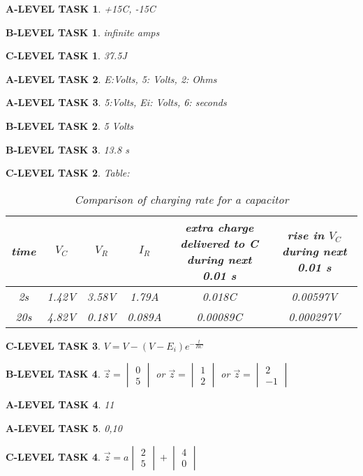 \documentclass{book}
\numberwithin{equation}{section}
\newtheorem{alevel}{A-LEVEL TASK}
\newtheorem{blevel}{B-LEVEL TASK}
\newtheorem{clevel}{C-LEVEL TASK}
\theoremstyle{definition}
\begin{document}
\begin{alevel}+15C, -15C\end{alevel}
\begin{blevel}infinite amps\end{blevel}
\begin{clevel}37.5J\end{clevel}

\begin{alevel}E:Volts, 5: Volts, 2: Ohms\end{alevel}
\begin{alevel}5:Volts, Ei: Volts, 6: seconds\end{alevel}
\begin{blevel}5 Volts\end{blevel}
\begin{blevel}13.8 s\end{blevel}

\begin{clevel} Table:\par
\begin{table}[H]
\begin{center}
\begin{tabular}{|c|c|c|c|c|c|} \hline
time&$V_C$&$V_R$&$I_R$&extra charge delivered to C during next 0.01 s&rise in $V_C$ during next 0.01 s \\ \hline
2s&1.42V&3.58V&1.79A&0.018C&0.00597V \\ \hline
20s&4.82V&0.18V&0.089A&0.00089C&0.000297V \\ \hline
\end{tabular}
\caption{Comparison of charging rate for a capacitor}
\end{center}
\end{table}
\end{clevel}

\begin{clevel}$V=V-(V-E_i)e^{-\frac{t}{RC}}$ \end{clevel}

\begin{blevel}
$\vec{z}= \begin{vmatrix}0\\5\end{vmatrix}$ or
$\vec{z}= \begin{vmatrix}1\\2\end{vmatrix}$ or 
$\vec{z}= \begin{vmatrix}2\\-1\end{vmatrix}$ 
\end{blevel}
\begin{alevel}11\end{alevel}
\begin{alevel}0,10\end{alevel}
\begin{clevel}$\vec{z}= a\begin{vmatrix}2\\5\end{vmatrix}+\begin{vmatrix}4\\0\end{vmatrix}$ \end{clevel}
\end{document}
